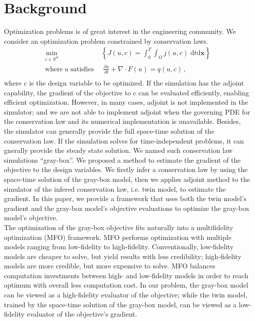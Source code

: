 \documentclass[a4paper,onecolumn]{article}
\theoremstyle{remark}
\begin{document}
\section{Background}
\label{background}
\noindent Optimization problems is of great interest in the engineering community. We consider an optimization problem
constrained by conservation laws.
\begin{equation}\begin{split}
    \min_{c\in\mathbb{R}^d} &\;\left\{ J(u,c)= \int_0^T\int_\Omega j(u,c) \; \textrm{d}t \textrm{d}\mathbf{x}\right\} \\
    \textrm{where}\; u\; \textrm{satisfies}& \;\; \frac{\partial u}{\partial t} + \nabla \cdot 
    F(u) =q(u,c)\,,\\
\end{split}\label{general opt}
\end{equation}
where $c$ is the design variable to be optimized.
If the simulation has the adjoint capability, the gradient of the objective to $c$ can be evaluated efficiently,
enabling efficient optimization.
However, in many cases, adjoint is not implemented in the simulator; and we are not able to implement
adjoint when the governing PDE for the conservation law and its numerical implementation is unavailable. 
Besides, the simulator can generally provide the full space-time solution of the conservation law. If the
simulation solves for time-independent problems, it can gnerally provide the steady state solution. 
We named such conservation law simulations ``gray-box''. We proposed a method to estimate the gradient
of the objective to the design variables. We firstly infer a conservation law by using the space-time solution
of the gray-box model, then we applies adjoint method to the simulator of the infered conservation law, i.e. twin model,
to estimate the gradient. In this paper, we provide a framework that uses both the twin model's gradient and
the gray-box model's objective evaluations to optimize the gray-box model's objective.\\

\noindent The optimization of the gray-box objective fits naturally into a multifidelity optimization (MFO) framework.
MFO performs optimization with multiple models ranging from
low-fidelity to high-fidelity. Conventionally, low-fidelity models are cheaper to solve, but yield
results with less credibility; high-fidelity models are more credible, but more expensive
to solve. MFO balances computation investments between high- and low-fidelity models
in order to reach optimum with overall less computation cost.
In our problem, the gray-box model can be viewed as a high-fidelity evaluator of the objective; while the twin model, trained
by the space-time solution of the gray-box model, can be viewed as a low-fidelity evaluator of the objective's
gradient.\\
\end{document}

